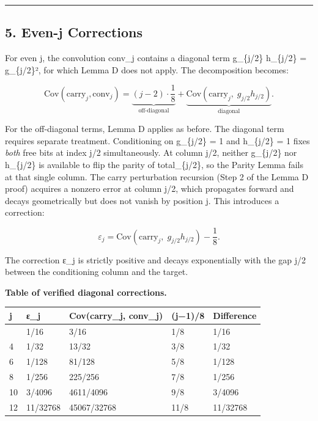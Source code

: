 \documentclass[
  11pt,
]{article}
\begin{document}
\begin{center}\rule{0.5\linewidth}{0.5pt}\end{center}

\newpage

\subsection{5. Even-j Corrections}\label{even-j-corrections}

For even j, the convolution conv\_j contains a diagonal term g\_\{j/2\}
h\_\{j/2\} = g\_\{j/2\}², for which Lemma D does not apply. The decomposition
becomes:

\[\text{Cov}(\text{carry}_j, \text{conv}_j) = \underbrace{(j-2) \cdot \frac{1}{8}}_{\text{off-diagonal}} + \underbrace{\text{Cov}(\text{carry}_j,\; g_{j/2} h_{j/2})}_{\text{diagonal}}.\]

For the off-diagonal terms, Lemma D applies as before. The diagonal term
requires separate treatment. Conditioning on g\_\{j/2\} = 1 and h\_\{j/2\} = 1
fixes \emph{both} free bits at index j/2 simultaneously. At column j/2, neither
g\_\{j/2\} nor h\_\{j/2\} is available to flip the parity of total\_\{j/2\}, so
the Parity Lemma fails at that single column. The carry perturbation recursion
(Step 2 of the Lemma D proof) acquires a nonzero error at column j/2, which
propagates forward and decays geometrically but does not vanish by position j.
This introduces a correction:

\[\varepsilon_j = \text{Cov}(\text{carry}_j,\; g_{j/2} h_{j/2}) - \frac{1}{8}.\]

The correction ε\_j is strictly positive and decays exponentially with the gap
j/2 between the conditioning column and the target.

\textbf{Table of verified diagonal corrections.}

\begin{longtable}[]{@{}lllll@{}}
\toprule\noalign{}
j & ε\_j & Cov(carry\_j, conv\_j) & (j−1)/8 & Difference \\
\midrule\noalign{}
\endhead
\bottomrule\noalign{}
\endlastfoot
2 & 1/16 & 3/16 & 1/8 & 1/16 \\
4 & 1/32 & 13/32 & 3/8 & 1/32 \\
6 & 1/128 & 81/128 & 5/8 & 1/128 \\
8 & 1/256 & 225/256 & 7/8 & 1/256 \\
10 & 3/4096 & 4611/4096 & 9/8 & 3/4096 \\
12 & 11/32768 & 45067/32768 & 11/8 & 11/32768 \\
\end{longtable}
\end{document}
